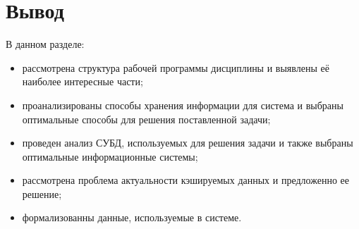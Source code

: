 \section*{Вывод}

В данном разделе:

\begin{itemize}
 \item рассмотрена структура рабочей программы дисциплины и выявлены её наиболее интересные части;
 \item проанализированы способы хранения информации для система и выбраны оптимальные способы для решения поставленной задачи; 
 \item проведен анализ СУБД, используемых для решения задачи и также выбраны оптимальные информационные системы; 
 \item рассмотрена проблема актуальности кэшируемых данных и предложенно ее решение;
 \item формализованны данные, используемые в системе.
\end{itemize}

